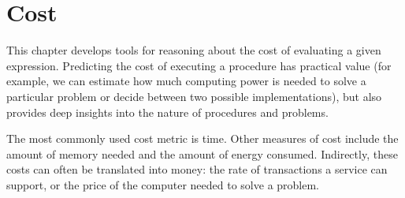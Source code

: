 \chapter{Cost}\label{ch:cost}\label{ch:resources}


\begin{schemeregion}

\begin{exercisenote}
\end{exercisenote}

This chapter develops tools for reasoning about the cost of evaluating a given expression.  Predicting the cost of executing a procedure has practical value (for example, we can estimate how much computing power is needed to solve a particular problem or decide between two possible implementations), but also provides deep insights into the nature of procedures and problems.

The most commonly used cost metric is time.  Other measures of cost include the amount of memory needed and the amount of energy consumed.  Indirectly, these costs can often be translated into money: the rate of transactions a service can support, or the price of the computer needed to solve a problem.  



\end{schemeregion}
